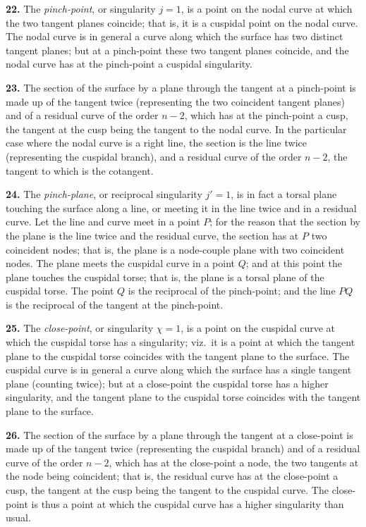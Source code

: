 \documentclass[11pt,a4paper]{article}
\begin{document}
\textbf{22.} The \textit{pinch-point}, or singularity $j=1$, is a point on the nodal curve at which the two tangent planes coincide; that is, it is a cuspidal point on the nodal curve. The nodal curve is in general a curve along which the surface has two distinct tangent planes; but at a pinch-point these two tangent planes coincide, and the nodal curve has at the pinch-point a cuspidal singularity.

\textbf{23.} The section of the surface by a plane through the tangent at a pinch-point is made up of the tangent twice (representing the two coincident tangent planes) and of a residual curve of the order $n-2$, which has at the pinch-point a cusp, the tangent at the cusp being the tangent to the nodal curve. In the particular case where the nodal curve is a right line, the section is the line twice (representing the cuspidal branch), and a residual curve of the order $n-2$, the tangent to which is the cotangent.

\textbf{24.} The \textit{pinch-plane}, or reciprocal singularity $j'=1$, is in fact a torsal plane touching the surface along a line, or meeting it in the line twice and in a residual curve. Let the line and curve meet in a point $P$; for the reason that the section by the plane is the line twice and the residual curve, the section has at $P$ two coincident nodes; that is, the plane is a node-couple plane with two coincident nodes. The plane meets the cuspidal curve in a point $Q$; and at this point the plane touches the cuspidal torse; that is, the plane is a torsal plane of the cuspidal torse. The point $Q$ is the reciprocal of the pinch-point; and the line $PQ$ is the reciprocal of the tangent at the pinch-point.

\textbf{25.} The \textit{close-point}, or singularity $\chi=1$, is a point on the cuspidal curve at which the cuspidal torse has a singularity; viz.\ it is a point at which the tangent plane to the cuspidal torse coincides with the tangent plane to the surface. The cuspidal curve is in general a curve along which the surface has a single tangent plane (counting twice); but at a close-point the cuspidal torse has a higher singularity, and the tangent plane to the cuspidal torse coincides with the tangent plane to the surface.

\textbf{26.} The section of the surface by a plane through the tangent at a close-point is made up of the tangent twice (representing the cuspidal branch) and of a residual curve of the order $n-2$, which has at the close-point a node, the two tangents at the node being coincident; that is, the residual curve has at the close-point a cusp, the tangent at the cusp being the tangent to the cuspidal curve. The close-point is thus a point at which the cuspidal curve has a higher singularity than usual.
\end{document}
